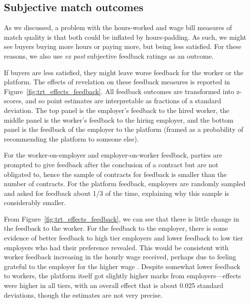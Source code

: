 \documentclass[12pt]{article}
\begin{document}
\subsection{Subjective match outcomes} 
As we discussed, a problem with the hours-worked and wage bill measures of match quality is that both could be inflated by hours-padding.
As such, we might see buyers buying more hours or paying more, but being less satisfied.
For these reasons, we also use \emph{ex post} subjective feedback ratings as an outcome. 

If buyers are less satisfied, they might leave worse feedback for the worker or the platform.
The effects of revelation on these feedback measures is reported in Figure~\ref{fig:trt_effects_feedback}.
All feedback outcomes are transformed into z-scores, and so point estimates are interpretable as fractions of a standard deviation. 
The top panel is the employer's feedback to the hired worker, the middle panel is the worker's feedback to the hiring employer, and the bottom panel is the feedback of the employer to the platform (framed as a probability of recommending the platform to someone else).  

For the worker-on-employer and employer-on-worker feedback, parties are prompted to give feedback after the conclusion of a contract but are not obligated to, hence the sample of contracts for feedback is smaller than the number of contracts.
For the platform feedback, employers are randomly sampled and asked for feedback about 1/3 of the time, explaining why this sample is considerably smaller. 

From Figure~\ref{fig:trt_effects_feedback}, we can see that there is little change in the feedback to the worker.
For the feedback to the employer, there is some evidence of better feedback to high tier employers and lower feedback to low tier employers who had their preference revealed.
This would be consistent with worker feedback increasing in the hourly wage received, perhaps due to feeling grateful to the employer for the higher wage \citep{akerlof1982labor}.
Despite somewhat lower feedback to workers, the platform itself got slightly higher marks from employers---effects were higher in all tiers, with an overall effect that is about 0.025 standard deviations, though the estimates are not very precise.  
\end{document}

